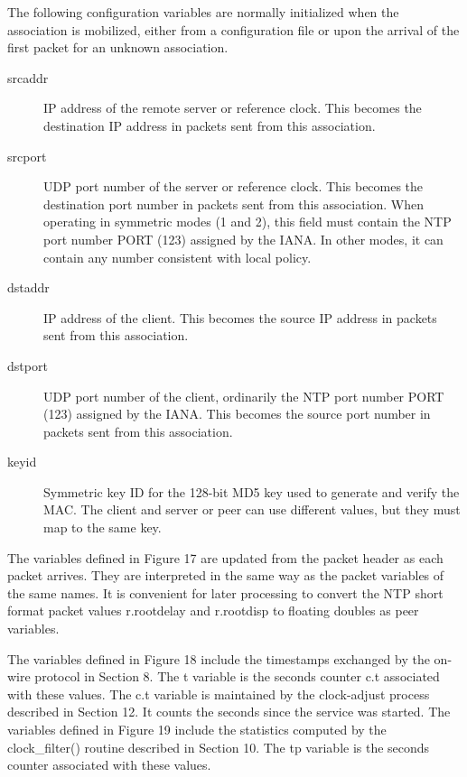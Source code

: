 The following configuration variables are normally initialized when
the association is mobilized, either from a configuration file or
upon the arrival of the first packet for an unknown association.

\begin{description}
  \item[srcaddr] IP address of the remote server or reference clock. This
becomes the destination IP address in packets sent from this
association.

  \item[srcport] UDP port number of the server or reference clock. This
becomes the destination port number in packets sent from this
association. When operating in symmetric modes (1 and 2), this field
must contain the NTP port number PORT (123) assigned by the IANA. In
other modes, it can contain any number consistent with local policy.

  \item[dstaddr] IP address of the client. This becomes the source IP
address in packets sent from this association.

  \item[dstport] UDP port number of the client, ordinarily the NTP port
number PORT (123) assigned by the IANA. This becomes the source port
number in packets sent from this association.

  \item[keyid] Symmetric key ID for the 128-bit MD5 key used to generate and
verify the MAC. The client and server or peer can use different
values, but they must map to the same key.
\end{description}

The variables defined in Figure 17 are updated from the packet header
as each packet arrives. They are interpreted in the same way as the
packet variables of the same names. It is convenient for later
processing to convert the NTP short format packet values r.rootdelay
and r.rootdisp to floating doubles as peer variables.

The variables defined in Figure 18 include the timestamps exchanged
by the on-wire protocol in Section 8. The t variable is the seconds
counter c.t associated with these values. The c.t variable is
maintained by the clock-adjust process described in Section 12. It
counts the seconds since the service was started. The variables
defined in Figure 19 include the statistics computed by the
clock\_filter() routine described in Section 10. The tp variable is
the seconds counter associated with these values.

